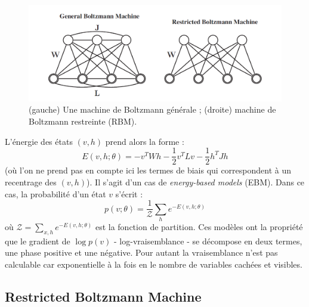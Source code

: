 \documentclass[10pt,a4paper]{article}
\begin{document}
\begin{figure}[ht!]
\centering
\includegraphics[width = \columnwidth]{fig/boltzmann_machine.png}
\caption{(gauche) Une machine de Boltzmann générale ; (droite) machine de Boltzmann restreinte (RBM).}
\label{fig3}
\end{figure}

L'énergie des états $(v,h)$ prend alors la forme : 
\begin{equation}
E(v,h ; \theta) = -v^TWh - \frac{1}{2}v^TLv - \frac{1}{2}h^T Jh
\end{equation}
(où l'on ne prend pas en compte ici les termes de biais qui correspondent à un recentrage des $(v,h)$). Il s'agit d'un cas de \emph{energy-based models} (EBM). Dans ce cas, la probabilité d'un état $v$ s'écrit : 
\begin{equation}
p(v;\theta) = \frac{1}{\mathcal{Z}}\sum_h e^{-E(v,h;\theta)}
\end{equation}
où $\mathcal{Z} = \sum_{x,h}e^{-E(v,h;\theta)}$ est la fonction de partition. Ces modèles ont la propriété que le gradient de $\log p(v)$ - log-vraisemblance - se décompose en deux termes, une phase positive et une négative. Pour autant la vraisemblance n'est pas calculable car exponentielle à la fois en le nombre de variables cachées et visibles. 



\subsection{Restricted Boltzmann Machine}
\end{document}
